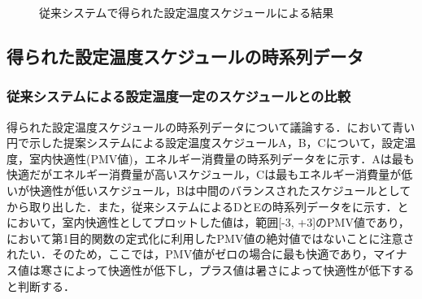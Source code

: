 \begin{figure}[htbp]
\begin{center}
\begin{minipage}{0.5\textwidth}
\begin{center}
      \end{center}
    \end{minipage}
  \end{center}
  \vspace{2mm}
  \caption{従来システムで得られた設定温度スケジュールによる結果}
  \label{fig::sim_result_schedule_const}
\end{figure}

\subsection{得られた設定温度スケジュールの時系列データ}\label{subsec::sim_schedule_timeseries}
\subsubsection{従来システムによる設定温度一定のスケジュールとの比較}
得られた設定温度スケジュールの時系列データについて議論する．において青い円で示した提案システムによる設定温度スケジュールA，B，Cについて，設定温度，室内快適性(PMV値)，エネルギー消費量の時系列データをに示す．Aは最も快適だがエネルギー消費量が高いスケジュール，Cは最もエネルギー消費量が低いが快適性が低いスケジュール，Bは中間のバランスされたスケジュールとしてから取り出した．また，従来システムによるDとEの時系列データをに示す．とにおいて，室内快適性としてプロットした値は，範囲[-3, +3]のPMV値であり，において第1目的関数の定式化に利用したPMV値の絶対値ではないことに注意されたい．そのため，ここでは，PMV値がゼロの場合に最も快適であり，マイナス値は寒さによって快適性が低下し，プラス値は暑さによって快適性が低下すると判断する．

